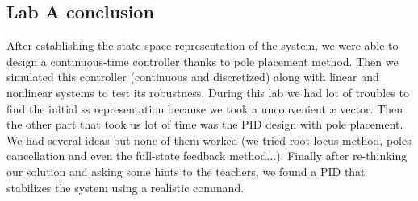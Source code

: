 \documentclass[11pt]{article}
\begin{document}
\subsection*{Lab A conclusion}
After establishing the state space representation of the system, we were able to design a continuous-time controller thanks to pole placement method. Then we simulated this controller (continuous and discretized) along with linear and nonlinear systems to test its robustness. During this lab we had lot of troubles to find the initial ss representation because we took a unconvenient $x$ vector. Then the other part that took us lot of time was the PID design with pole placement. We had several ideas but none of them worked (we tried root-locus method, poles cancellation and even the full-state feedback method...). Finally after re-thinking our solution and asking some hints to the teachers, we found a PID that stabilizes the system using a realistic command.
\end{document}

